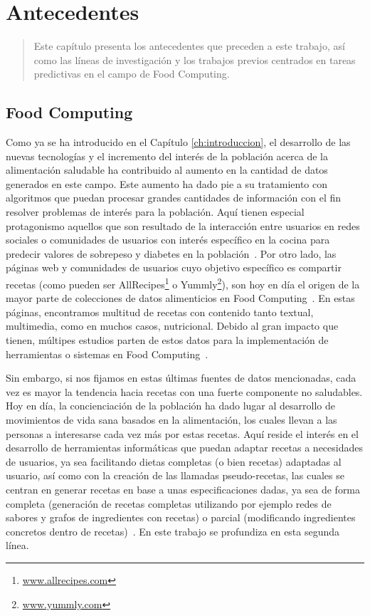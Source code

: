 \chapter{Antecedentes}
\label{ch:Capitulo 3}

\begin{quote}
  Este capítulo presenta los antecedentes que preceden a este trabajo, así como las líneas de investigación y los trabajos previos centrados en tareas predictivas en el campo de Food Computing.
\end{quote}


\section{Food Computing}

Como ya se ha introducido en el Capítulo \ref{ch:introduccion}, el desarrollo de las nuevas tecnologías y el incremento del interés de la población acerca de la alimentación saludable ha contribuido al aumento en la cantidad de datos generados en este campo. 
Este aumento ha dado pie a su tratamiento con algoritmos que puedan procesar grandes cantidades de información con el fin resolver problemas de interés para la población. Aquí tienen especial protagonismo aquellos que son resultado de la interacción entre usuarios en redes sociales o comunidades de usuarios con interés específico en la cocina para predecir valores de sobrepeso y diabetes en la población~\cite{Fried2015,Abbar2015}. Por otro lado, las páginas web y comunidades de usuarios cuyo objetivo específico es compartir recetas (como pueden ser AllRecipes\footnote{\url{www.allrecipes.com}} o Yummly\footnote{\url{www.yummly.com}}), son hoy en día el origen de la mayor parte de colecciones de datos alimenticios en Food Computing~\cite{min2019survey}. En estas páginas, encontramos multitud de recetas con contenido tanto textual, multimedia, como en muchos casos, nutricional. Debido al gran impacto que tienen, múltipes estudios parten de estos datos para la implementación de herramientas o sistemas en Food Computing~\cite{10.3389/fict.2018.00014,10.1007/978-3-319-02432-5_19}.

Sin embargo, si nos fijamos en estas últimas fuentes de datos mencionadas, cada vez es mayor la tendencia hacia recetas con una fuerte componente no saludables. Hoy en día, la concienciación de la población ha dado lugar al desarrollo de movimientos de vida sana basados en la alimentación, los cuales llevan a las personas a interesarse cada vez más por estas recetas. Aquí reside el interés en el desarrollo de herramientas informáticas que puedan adaptar recetas a necesidades de usuarios, ya sea facilitando dietas completas (o bien recetas) adaptadas al usuario, así como con la creación de las llamadas pseudo-recetas, las cuales se centran en generar recetas en base a unas especificaciones dadas, ya sea de forma completa (generación de recetas completas utilizando por ejemplo redes de sabores y grafos de ingredientes con recetas) o parcial (modificando ingredientes concretos dentro de recetas)~\cite{chen2019eating}. En este trabajo se profundiza en esta segunda línea. 

